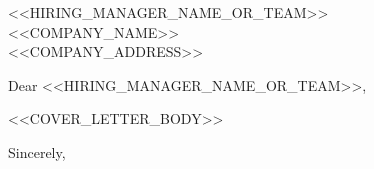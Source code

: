 \documentclass[<<FONT_SIZE>>,a4paper]{letter}
\begin{document}
\begin{letter}{
    <<HIRING_MANAGER_NAME_OR_TEAM>>\\
    <<COMPANY_NAME>>\\
    <<COMPANY_ADDRESS>>
}

\opening{Dear <<HIRING_MANAGER_NAME_OR_TEAM>>,}

<<COVER_LETTER_BODY>>

\closing{Sincerely,}

\end{letter}
\end{document}
